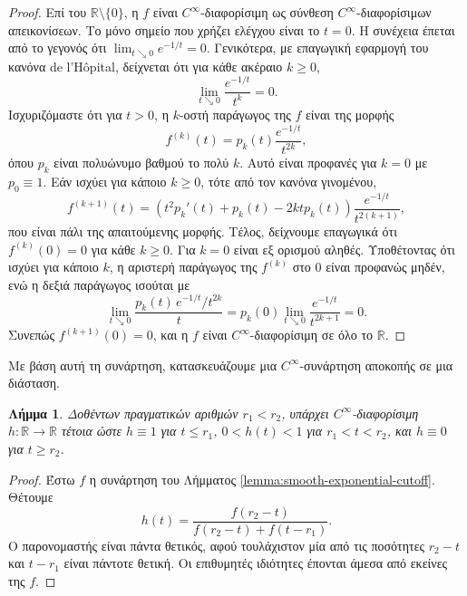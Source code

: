\documentclass[11pt,a4paper,twoside,openright]{book}
\newtheorem{lemma}{Λήμμα}[section]
\begin{document}
\begin{proof}
Επί του $\mathbb{R} \setminus \{0\}$, η $f$ είναι $C^\infty$-διαφορίσιμη ως σύνθεση $C^\infty$-διαφορίσιμων απεικονίσεων. Το μόνο σημείο που χρήζει ελέγχου είναι το $t = 0$. Η συνέχεια έπεται από το γεγονός ότι $\lim_{t \searrow 0} e^{-1/t} = 0$. Γενικότερα, με επαγωγική εφαρμογή του κανόνα de l'H\^opital, δείχνεται ότι για κάθε ακέραιο $k \ge 0$,
\begin{equation*}
\lim_{t \searrow 0} \frac{e^{-1/t}}{t^k} = 0.
\end{equation*}
Ισχυριζόμαστε ότι για $t > 0$, η $k$-οστή παράγωγος της $f$ είναι της μορφής
\begin{equation*}
f^{(k)}(t) = p_k(t) \frac{e^{-1/t}}{t^{2k}},
\end{equation*}
όπου $p_k$ είναι πολυώνυμο βαθμού το πολύ $k$. Αυτό είναι προφανές για $k = 0$ με $p_0 \equiv 1$. Εάν ισχύει για κάποιο $k \ge 0$, τότε από τον κανόνα γινομένου,
\begin{equation*}
f^{(k+1)}(t) = \left( t^2 p_k'(t) + p_k(t) - 2k t p_k(t) \right) \frac{e^{-1/t}}{t^{2(k+1)}},
\end{equation*}
που είναι πάλι της απαιτούμενης μορφής. Τέλος, δείχνουμε επαγωγικά ότι $f^{(k)}(0) = 0$ για κάθε $k \ge 0$. Για $k = 0$ είναι εξ ορισμού αληθές. Υποθέτοντας ότι ισχύει για κάποιο $k$, η αριστερή παράγωγος της $f^{(k)}$ στο $0$ είναι προφανώς μηδέν, ενώ η δεξιά παράγωγος ισούται με
\begin{equation*}
\lim_{t \searrow 0} \frac{p_k(t) \, e^{-1/t} / t^{2k}}{t}
= p_k(0) \lim_{t \searrow 0} \frac{e^{-1/t}}{t^{2k+1}}
= 0.
\end{equation*}
Συνεπώς $f^{(k+1)}(0) = 0$, και η $f$ είναι $C^\infty$-διαφορίσιμη σε όλο το $\mathbb{R}$.
\end{proof}

\noindent
Με βάση αυτή τη συνάρτηση, κατασκευάζουμε μια $C^\infty$-συνάρτηση αποκοπής σε μια διάσταση.

\begin{lemma}\label{lemma:smooth-cutoff-one-dimensional}
Δοθέντων πραγματικών αριθμών $r_1 < r_2$, υπάρχει $C^\infty$-διαφορίσιμη $h: \mathbb{R} \to \mathbb{R}$ τέτοια ώστε $h \equiv 1$ για $t \le r_1$, $0 < h(t) < 1$ για $r_1 < t < r_2$, και $h \equiv 0$ για $t \ge r_2$.
\end{lemma}

\begin{proof}
Έστω $f$ η συνάρτηση του Λήμματος \ref{lemma:smooth-exponential-cutoff}. Θέτουμε
\begin{equation*}
h(t) = \frac{f(r_2 - t)}{f(r_2 - t) + f(t - r_1)}.
\end{equation*}
Ο παρονομαστής είναι πάντα θετικός, αφού τουλάχιστον μία από τις ποσότητες $r_2 - t$ και $t - r_1$ είναι πάντοτε θετική. Οι επιθυμητές ιδιότητες έπονται άμεσα από εκείνες της $f$.
\end{proof}
\end{document}
